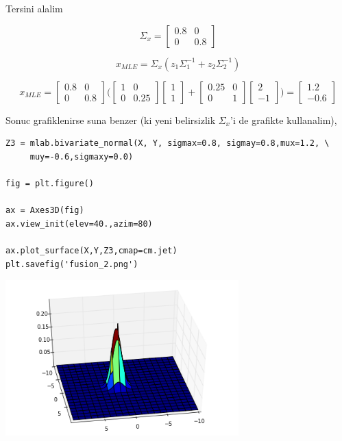 \documentclass[12pt,fleqn]{article}\usepackage{../common}
\begin{document}
Tersini alalim 

$$ \Sigma_x =
\left[\begin{array}{cc}
0.8 & 0 \\ 0 & 0.8
\end{array}\right] 
$$

$$ x_{MLE} =  \Sigma_x (z_1\Sigma_1^{-1}  + z_2\Sigma_2^{-1}) $$

$$ 
x_{MLE} =
\left[\begin{array}{cc}
0.8 & 0 \\ 0 & 0.8
\end{array}\right] 
\bigg(
\left[\begin{array}{cc}
1 & 0 \\ 0 & 0.25
\end{array}\right] 
\left[\begin{array}{c}
1 \\ 1
\end{array}\right]  + 
\left[\begin{array}{cc}
0.25 & 0 \\ 0 & 1
\end{array}\right] 
\left[\begin{array}{r}
2 \\ -1
\end{array}\right]  
\bigg) = 
\left[\begin{array}{r}
1.2 \\ -0.6
\end{array}\right]  
$$

Sonuc grafiklenirse suna benzer (ki yeni belirsizlik $\Sigma_x$'i de
grafikte kullanalim),

\begin{verbatim}
Z3 = mlab.bivariate_normal(X, Y, sigmax=0.8, sigmay=0.8,mux=1.2, \
     muy=-0.6,sigmaxy=0.0)

fig = plt.figure()

ax = Axes3D(fig)
ax.view_init(elev=40.,azim=80)

ax.plot_surface(X,Y,Z3,cmap=cm.jet)
plt.savefig('fusion_2.png')
\end{verbatim}



\includegraphics[height=6cm]{fusion_2.png}
\end{document}
